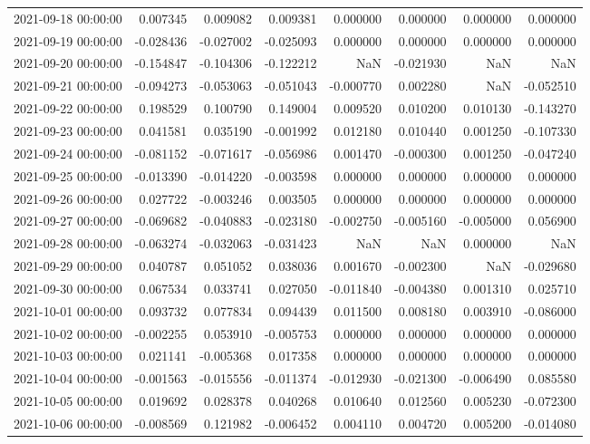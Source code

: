 \begin{tabular}{lrrrrrrr}
2021-09-18 00:00:00 & 0.007345 & 0.009082 & 0.009381 & 0.000000 & 0.000000 & 0.000000 & 0.000000 \\
2021-09-19 00:00:00 & -0.028436 & -0.027002 & -0.025093 & 0.000000 & 0.000000 & 0.000000 & 0.000000 \\
2021-09-20 00:00:00 & -0.154847 & -0.104306 & -0.122212 & NaN & -0.021930 & NaN & NaN \\
2021-09-21 00:00:00 & -0.094273 & -0.053063 & -0.051043 & -0.000770 & 0.002280 & NaN & -0.052510 \\
2021-09-22 00:00:00 & 0.198529 & 0.100790 & 0.149004 & 0.009520 & 0.010200 & 0.010130 & -0.143270 \\
2021-09-23 00:00:00 & 0.041581 & 0.035190 & -0.001992 & 0.012180 & 0.010440 & 0.001250 & -0.107330 \\
2021-09-24 00:00:00 & -0.081152 & -0.071617 & -0.056986 & 0.001470 & -0.000300 & 0.001250 & -0.047240 \\
2021-09-25 00:00:00 & -0.013390 & -0.014220 & -0.003598 & 0.000000 & 0.000000 & 0.000000 & 0.000000 \\
2021-09-26 00:00:00 & 0.027722 & -0.003246 & 0.003505 & 0.000000 & 0.000000 & 0.000000 & 0.000000 \\
2021-09-27 00:00:00 & -0.069682 & -0.040883 & -0.023180 & -0.002750 & -0.005160 & -0.005000 & 0.056900 \\
2021-09-28 00:00:00 & -0.063274 & -0.032063 & -0.031423 & NaN & NaN & 0.000000 & NaN \\
2021-09-29 00:00:00 & 0.040787 & 0.051052 & 0.038036 & 0.001670 & -0.002300 & NaN & -0.029680 \\
2021-09-30 00:00:00 & 0.067534 & 0.033741 & 0.027050 & -0.011840 & -0.004380 & 0.001310 & 0.025710 \\
2021-10-01 00:00:00 & 0.093732 & 0.077834 & 0.094439 & 0.011500 & 0.008180 & 0.003910 & -0.086000 \\
2021-10-02 00:00:00 & -0.002255 & 0.053910 & -0.005753 & 0.000000 & 0.000000 & 0.000000 & 0.000000 \\
2021-10-03 00:00:00 & 0.021141 & -0.005368 & 0.017358 & 0.000000 & 0.000000 & 0.000000 & 0.000000 \\
2021-10-04 00:00:00 & -0.001563 & -0.015556 & -0.011374 & -0.012930 & -0.021300 & -0.006490 & 0.085580 \\
2021-10-05 00:00:00 & 0.019692 & 0.028378 & 0.040268 & 0.010640 & 0.012560 & 0.005230 & -0.072300 \\
2021-10-06 00:00:00 & -0.008569 & 0.121982 & -0.006452 & 0.004110 & 0.004720 & 0.005200 & -0.014080 \\

\end{tabular}
